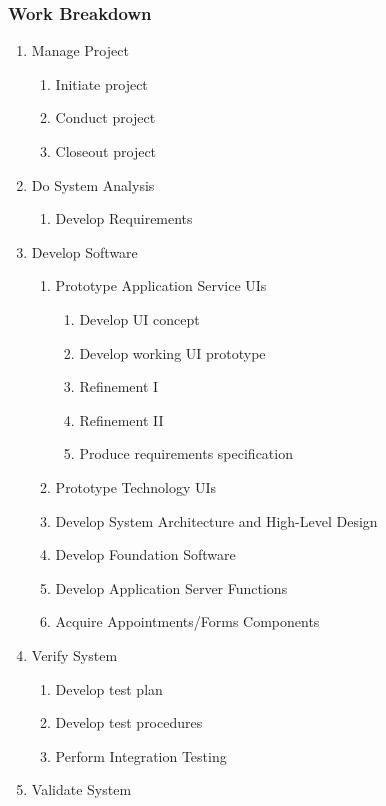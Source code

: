 \documentclass[11pt]{article}
\begin{document}
\subsubsection{Work Breakdown}

\begin{enumerate}
\item Manage Project
  \begin{enumerate}
  \item Initiate project
  \item Conduct project
  \item Closeout project
  \end{enumerate}
\item Do System Analysis
  \begin{enumerate}
  \item Develop Requirements
  \end{enumerate}
\item Develop Software
  \begin{enumerate}
  \item Prototype Application Service UIs
    \begin{enumerate}
    \item \label{wbs:pre1} Develop UI concept
    \item \label{wbs:task} Develop working UI prototype
    \item \label{wbs:post1} Refinement I
    \item Refinement II
    \item Produce requirements specification
    \end{enumerate}
  \item Prototype Technology UIs
  \item Develop System Architecture and High-Level Design
  \item Develop Foundation Software
  \item Develop Application Server Functions
  \item Acquire Appointments/Forms Components
  \end{enumerate}
\item Verify System
  \begin{enumerate}
  \item Develop test plan
  \item Develop test procedures
  \item Perform Integration Testing
  \end{enumerate}
\item Validate System
  \begin{enumerate}

\end{enumerate}
\end{enumerate}
\end{document}
